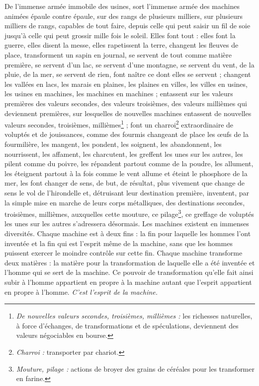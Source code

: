 	{De l’immense armée immobile des usines, sort l’immense armée des machines animées épaule contre épaule, sur des rangs de plusieurs milliers, sur plusieurs milliers de rangs, capables de tout faire, depuis celle qui peut saisir un fil de soie jusqu’à celle qui peut grossir mille fois le soleil. Elles font tout : elles font la guerre, elles disent la messe, elles rapetissent la terre, changent les fleuves de place, transforment un sapin en journal, se servent de tout comme matière première, se servent d’un lac, se servent d’une montagne, se servent du vent, de la pluie, de la mer, se servent de rien, font naître ce dont elles se servent ; changent les vallées en lacs, les marais en plaines, les plaines en villes, les villes en usines, les usines en machines, les machines en machines ; entassent sur les valeurs premières des valeurs secondes, des valeurs troisièmes, des valeurs millièmes qui deviennent premières, sur lesquelles de nouvelles machines entassent de nouvelles valeurs secondes, troisièmes, millièmes\footnote{\emph{De nouvelles valeurs secondes, troisièmes, millièmes :} les richesses naturelles, à force d’échanges, de transformations et de spéculations, deviennent des valeurs négociables en bourse.} ; font un charroi\footnote{\emph{Charroi :} transporter par chariot.} extraordinaire de voluptés et de jouissances, comme des fourmis changeant de place les œufs de la fourmilière, les mangent, les pondent, les soignent, les abandonnent, les nourrissent, les affament, les charcutent, les greffent les unes sur les autres, les pilent comme du poivre, les répandent partout comme de la poudre, les allument, les éteignent partout à la fois comme le vent allume et éteint le phosphore de la mer, les font changer de sens, de but, de résultat, plus vivement que change de sens le vol de l’hirondelle et, détruisant leur destination première, inventent, par la simple mise en marche de leurs corps métalliques, des destinations secondes, troisièmes, millièmes, auxquelles cette mouture, ce pilage\footnote{\emph{Mouture, pilage :} actions de broyer des grains de céréales pour les transformer en farine.}, ce greffage de voluptés les unes sur les autres s’adressera désormais. Les machines existent en immenses diversités. Chaque machine est à deux fins : la fin pour laquelle les hommes l’ont inventée et la fin qui est l’esprit même de la machine, sans que les hommes puissent exercer le moindre contrôle sur cette fin. Chaque machine transforme deux matières : la matière pour la transformation de laquelle elle a été inventée et l’homme qui se sert de la machine. Ce pouvoir de transformation qu’elle fait ainsi subir à l’homme appartient en propre à la machine autant que l’esprit appartient en propre à l’homme. \emph{C’est l’esprit de la machine.}
}
